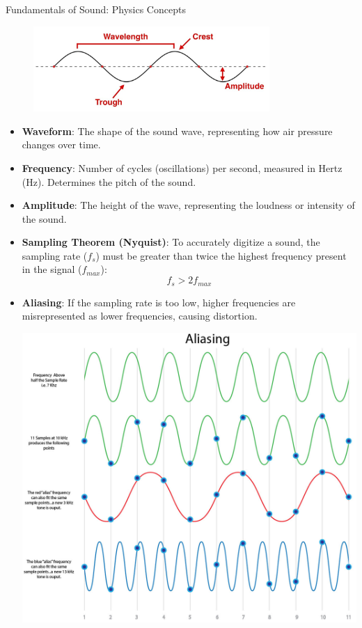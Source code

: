 \begin{frame}[allowframebreaks]{Fundamentals of Sound: Physics Concepts}
    \begin{figure}
        \centering
        \includegraphics[width=0.8\textwidth]{images/audio-nlp/sound-props.png}
    \end{figure}
    \begin{itemize}
        \item \textbf{Waveform}: The shape of the sound wave, representing how air pressure changes over time.
        \item \textbf{Frequency}: Number of cycles (oscillations) per second, measured in Hertz (Hz). Determines the pitch of the sound.
        \item \textbf{Amplitude}: The height of the wave, representing the loudness or intensity of the sound.
    \end{itemize}
\framebreak
    \begin{itemize}
        \item \textbf{Sampling Theorem (Nyquist)}: To accurately digitize a sound, the sampling rate ($f_s$) must be greater than twice the highest frequency present in the signal ($f_{max}$):
        \[
            f_s > 2f_{max}
        \]
        \item \textbf{Aliasing}: If the sampling rate is too low, higher frequencies are misrepresented as lower frequencies, causing distortion. 
        \begin{center}
            \includegraphics[width=\textwidth,height=0.9\textheight,keepaspectratio]{images/audio-nlp/aliasing.png}
        \end{center}
    \end{itemize}
\end{frame}